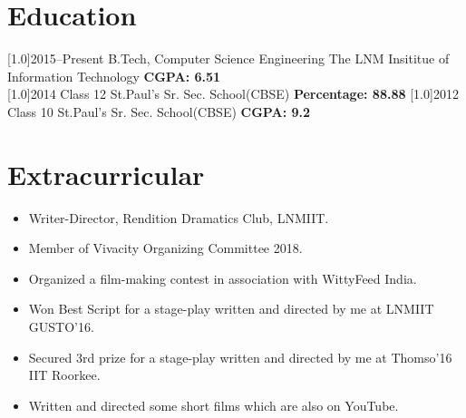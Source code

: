 \documentclass[english]{cv-style}     %
\begin{document}
\section{Education}
  \vspace{-0.2cm}
\begin{entrylist}
\entry
{\scalebox{.8}[1.0]{2015--Present}}
{B.Tech, Computer Science Engineering}
{The LNM Insititue of Information Technology}
{\textbf{CGPA: 6.51}\\
\small{}}
\entry
{\scalebox{.8}[1.0]{2014}}
{Class 12}
{St.Paul's Sr. Sec. School(CBSE)}
{\textbf{Percentage: 88.88}}
\entry
{\scalebox{.8}[1.0]{2012}}
{Class 10}
{St.Paul's Sr. Sec. School(CBSE)}
{\textbf{CGPA: 9.2}}
\end{entrylist}
\section{Extracurricular}
  \vspace{-0.2cm}
\begin{itemize}
\item  Writer-Director, Rendition Dramatics Club, LNMIIT.
\item Member of Vivacity Organizing Committee 2018.
\item Organized a film-making contest in association with WittyFeed India.
\item Won Best Script for a stage-play written and directed by me at LNMIIT GUSTO’16.
\item Secured 3rd prize for a stage-play written and directed by me at Thomso’16 IIT Roorkee.
\item Written and directed some short films which are also on YouTube.
\end{itemize}

  \vspace{-0.2cm}
\end{document}
